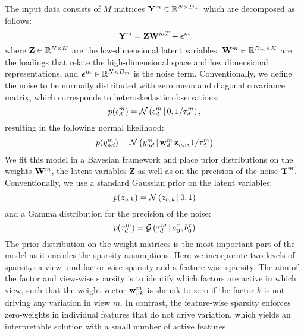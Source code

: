 \documentclass[10pt, a4paper,openany]{report}
\begin{document}
The input data consists of $M$ matrices ${\bf Y}^m \in \mathbb{R}^{N \times D_m}$ which are decomposed as follows:
\[
\mathbf{Y}^m = \mathbf{Z}\mathbf{W}^{mT} + \mbox{\boldmath $\epsilon$}^m
\]
where  ${\bf Z} \in \mathbb{R}^{N \times K}$ are the low-dimensional latent variables, ${\bf W}^m \in \mathbb{R}^{D_m \times K}$ are the loadings that relate the high-dimensional space and low dimensional representations, and $\mbox{\boldmath $\epsilon$}^m \in \mathbb{R}^{N \times D_m}$ is the noise term. 
Conventionally, we define the noise to be normally distributed with zero mean and diagonal covariance matrix, which corresponds to heteroskedastic observations:
\[
p(\epsilon^m_d) = \mathcal{N}\left(\epsilon^m_d \,|\, 0,1/\tau_d^m\right),
\]
resulting in the following normal likelihood:
\[
p(y_{nd}^m) = \mathcal{N}\left(y_{nd}^m \,|\, {\bf w}_{d,:}^m{\bf z}_{n,:},1/\tau_d^m\right)
\]
We fit this model in a Bayesian framework and place prior distributions on the weights ${\bf W}^m$, the latent variables $\mathbf{Z}$ as well as on the precision of the noise $\mbox{\boldmath $\mathrm{T}$}^m$.
Conventionally, we use a standard Gaussian prior on the latent variables:
\[
p(z_{n,k}) = \mathcal{N}\left(z_{n,k} \,|\, 0,1\right)
\]
and a Gamma distribution for the precision of the noise:
\[
p(\tau_d^m) = \mathcal{G}\left(\tau_d^m \,|\, a_0^\tau,b_0^\tau\right)
\]
The prior distribution on the weight matrices is the most important part of the model as it encodes the sparsity assumptions. Here we incorporate two levels of sparsity: a view- and factor-wise sparsity and a feature-wise sparsity. The aim of the factor and view-wise sparsity is to identify which factors are active in which view, such that the weight vector ${\bf w}_{:,k}^m$ is shrunk to zero if the factor $k$ is not driving any variation in view $m$. 
In contrast, the feature-wise sparsity enforces zero-weights in individual features that do not drive variation, which yields an interpretable solution with a small number of active features.\\
\end{document}
